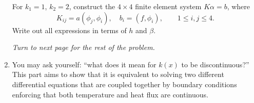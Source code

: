 \begin{enumerate}
For $k_1 = 1$, $k_2 = 2$, construct the $4\times 4$ finite element system $K\alpha = b$, where 
\[
K_{ij} = a(\phi_j,\phi_i), \quad b_i = (f,\phi_i), \qquad 1 \leq i,j \leq 4.
\]
Write out all expressions in terms of $h$ and $\beta$.  
\vspace{2cm}

 \begin{center}
 \emph{Turn to next page for the rest of the problem.}
 \end{center}
 
 \newpage
 \item  You may ask yourself: ``what does it mean for $k(x)$ to be discontinuous?''  This part aims to show that it is equivalent to solving two different differential equations that are coupled together by boundary conditions enforcing that both temperature and heat flux are continuous.  
 

\end{enumerate}
